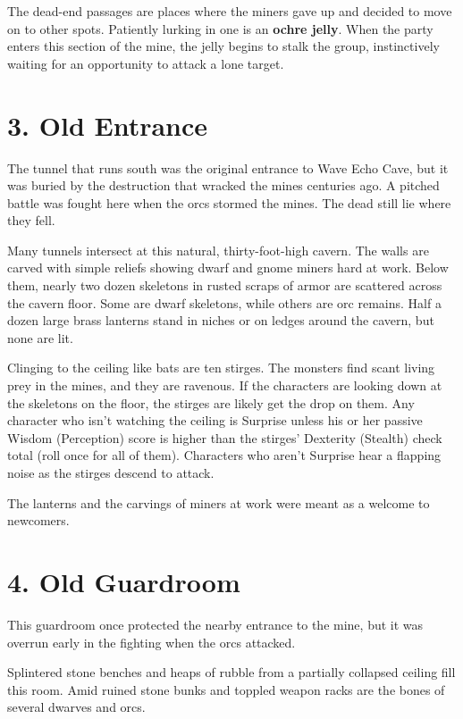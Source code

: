 \documentclass[10pt,a4paper,twoside,bg=print,twocolumn,openany,nodeprecatedcode]{dndbook}
\begin{document}
The dead-end passages are places where the miners gave up and decided to move on to other spots. Patiently lurking in one is an \textbf{ochre jelly}. When the party enters this section of the mine, the jelly begins to stalk the group, instinctively waiting for an opportunity to attack a lone target.

\section{3. Old Entrance}
The tunnel that runs south was the original entrance to Wave Echo Cave, but it was buried by the destruction that wracked the mines centuries ago. A pitched battle was fought here when the orcs stormed the mines. The dead still lie where they fell.

\begin{DndReadAloud}{}
Many tunnels intersect at this natural, thirty-foot-high cavern. The walls are carved with simple reliefs showing dwarf and gnome miners hard at work. Below them, nearly two dozen skeletons in rusted scraps of armor are scattered across the cavern floor. Some are dwarf skeletons, while others are orc remains. Half a dozen large brass lanterns stand in niches or on ledges around the cavern, but none are lit.

\end{DndReadAloud}

Clinging to the ceiling like bats are ten stirges. The monsters find scant living prey in the mines, and they are ravenous. If the characters are looking down at the skeletons on the floor, the stirges are likely get the drop on them. Any character who isn't watching the ceiling is Surprise unless his or her passive Wisdom (Perception) score is higher than the stirges' Dexterity (Stealth) check total (roll once for all of them). Characters who aren't Surprise hear a flapping noise as the stirges descend to attack.

The lanterns and the carvings of miners at work were meant as a welcome to newcomers.

\section{4. Old Guardroom}
This guardroom once protected the nearby entrance to the mine, but it was overrun early in the fighting when the orcs attacked.

\begin{DndReadAloud}{}
Splintered stone benches and heaps of rubble from a partially collapsed ceiling fill this room. Amid ruined stone bunks and toppled weapon racks are the bones of several dwarves and orcs.

\end{DndReadAloud}
\end{document}
